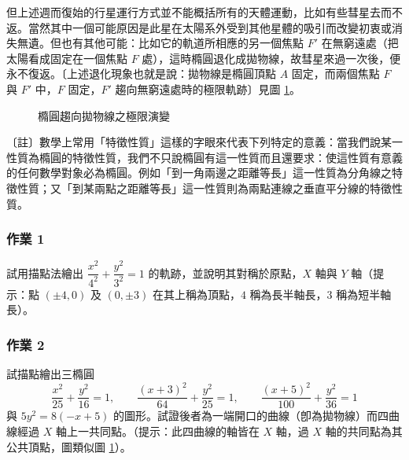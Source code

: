 但上述週而復始的行星運行方式並不能概括所有的天體運動，比如有些彗星去而不返。當然其中一個可能原因是此星在太陽系外受到其他星體的吸引而改變初衷或消失無遺。但也有其他可能：比如它的軌道所相應的另一個焦點 $F'$ 在無窮遠處（把太陽看成固定在一個焦點 $F$ 處），這時橢圓退化成拋物線，故彗星來過一次後，便永不復返。〔上述退化現象也就是說：拋物線是橢圓頂點 $A$ 固定，而兩個焦點 $F$ 與 $F'$ 中，$F$ 固定，$F'$ 趨向無窮遠處時的極限軌跡〕見圖 \ref{fig:b4s-2-1-8}。

\begin{figure}[H]
\centering
{}
\caption{橢圓趨向拋物線之極限演變}
\label{fig:b4s-2-1-8}
\end{figure}

〔註〕數學上常用「特徵性質」這樣的字眼來代表下列特定的意義：當我們說某一性質為橢圓的特徵性質，我們不只說橢圓有這一性質而且還要求：使這性質有意義的任何數學對象必為橢圓。例如「到一角兩邊之距離等長」這一性質為分角線之特徵性質；又「到某兩點之距離等長」這一性質則為兩點連線之垂直平分線的特徵性質。

\subsubsection*{作業 1}
試用描點法繪出 $\dfrac{x^2}{4^2} + \dfrac{y^2}{3^2} = 1$ 的軌跡，並說明其對稱於原點，$X$ 軸與 $Y$ 軸（提示：點 $(\pm 4, 0)$ 及 $(0, \pm 3)$ 在其上稱為頂點，$4$ 稱為長半軸長，$3$ 稱為短半軸長）。

\subsubsection*{作業 2}
試描點繪出三橢圓
\[ \frac{x^2}{25} + \frac{y^2}{16} = 1, \qquad \frac{(x+3)^2}{64} + \frac{y^2}{25} = 1, \qquad \frac{(x+5)^2}{100} + \frac{y^2}{36} = 1 \]
與 $5y^2 = 8(-x + 5)$ 的圖形。試證後者為一端開口的曲線（卽為拋物線）而四曲線經過 $X$ 軸上一共同點。（提示：此四曲線的軸皆在 $X$ 軸，過 $X$ 軸的共同點為其公共頂點，圖類似圖 \ref{fig:b4s-2-1-8}）。

